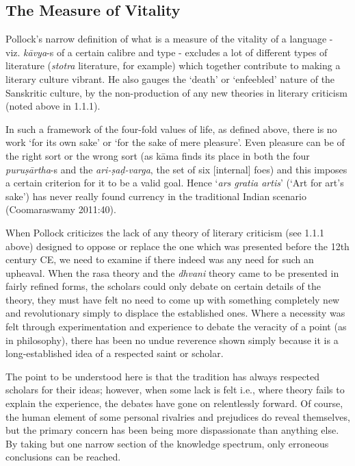 \subsection{The Measure of Vitality}
\vskip -5pt

Pollock’s narrow definition of what is a measure of the vitality of a language - viz. {\sl kāvya}-s of a certain calibre and type - excludes a lot of different types of literature ({\sl stotra} literature, for example) which together contribute to making a literary culture vibrant. He also gauges the ‘death’ or ‘enfeebled’ nature of the Sanskritic culture,  by the non-production of any new theories in literary criticism (noted above in 1.1.1).

In such a framework of the four-fold values of life, as defined above, there is no work ‘for its own sake’ or ‘for the sake of mere pleasure’. Even pleasure can be of the right sort or the wrong sort (as kāma finds its place in both the four {\sl puruṣārtha}-s and the {\sl ari-ṣaḍ-varga}, the set of six [internal] foes) and this imposes a certain criterion for it to be a valid goal. Hence ‘{\sl ars gratia artis}’ (‘Art for art’s sake’) has never really found currency in the traditional Indian scenario (Coomaraswamy 2011:40). 

When Pollock criticizes the lack of any theory of literary criticism (see 1.1.1 above) designed to oppose or replace the one which was presented before the 12th century CE, we need to examine if there indeed was any need for such an upheaval. When the rasa theory and the {\sl dhvani} theory came to be presented in fairly refined forms, the scholars could only debate on certain details of the theory, they must have felt no need to come up with something completely new and revolutionary simply to displace the established ones. Where a necessity was felt through experimentation and experience to debate the veracity of a point (as in philosophy), there has been no undue reverence shown simply because it is a long-established idea of a respected saint or scholar.

The point to be understood here is that the tradition has always respected scholars for their ideas; however, when some lack is felt i.e., where theory fails to explain the experience, the debates have gone on relentlessly forward. Of course, the human element of some personal rivalries and prejudices do reveal themselves, but the primary concern has been being more dispassionate than anything else. By taking but one narrow section of the knowledge spectrum, only erroneous conclusions can be reached. 

